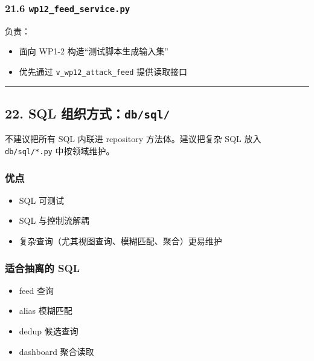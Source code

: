 \documentclass[UTF8]{ctexart}
\providecommand{\tightlist}{%
  \setlength{\itemsep}{0pt}\setlength{\parskip}{0pt}}
\begin{document}
\hypertarget{wp12_feed_service.py}{%
\subsubsection{\texorpdfstring{21.6
\texttt{wp12\_feed\_service.py}}{21.6 wp12\_feed\_service.py}}\label{wp12_feed_service.py}}

负责：

\begin{itemize}
\tightlist
\item
  面向 WP1-2 构造``测试脚本生成输入集''
\item
  优先通过 \texttt{v\_wp12\_attack\_feed} 提供读取接口
\end{itemize}

\begin{center}\rule{0.5\linewidth}{0.5pt}\end{center}

\hypertarget{sql-ux7ec4ux7ec7ux65b9ux5f0fdbsql}{%
\subsection{\texorpdfstring{22. SQL
组织方式：\texttt{db/sql/}}{22. SQL 组织方式：db/sql/}}\label{sql-ux7ec4ux7ec7ux65b9ux5f0fdbsql}}

不建议把所有 SQL 内联进 repository 方法体。建议把复杂 SQL 放入
\texttt{db/sql/*.py} 中按领域维护。

\hypertarget{ux4f18ux70b9}{%
\subsubsection{优点}\label{ux4f18ux70b9}}

\begin{itemize}
\tightlist
\item
  SQL 可测试
\item
  SQL 与控制流解耦
\item
  复杂查询（尤其视图查询、模糊匹配、聚合）更易维护
\end{itemize}

\hypertarget{ux9002ux5408ux62bdux79bbux7684-sql}{%
\subsubsection{适合抽离的
SQL}\label{ux9002ux5408ux62bdux79bbux7684-sql}}

\begin{itemize}
\tightlist
\item
  feed 查询
\item
  alias 模糊匹配
\item
  dedup 候选查询
\item
  dashboard 聚合读取
\end{itemize}
\end{document}

